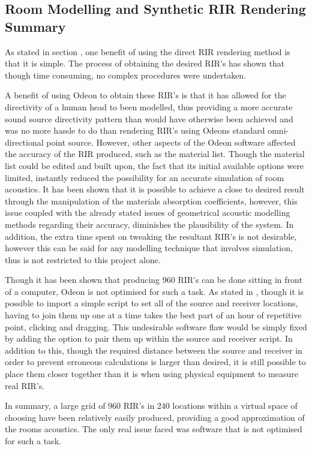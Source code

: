 \documentclass[../../main.tex]{subfiles}
\begin{document}
		\subsection{Room Modelling and Synthetic RIR Rendering Summary}

			As stated in section , one benefit of using the direct \ac{RIR} rendering method is that it is simple. The process of obtaining the desired \ac{RIR}'s has shown that though time consuming, no complex procedures were undertaken.

			A benefit of using Odeon to obtain these \ac{RIR}'s is that it has allowed for the directivity of a human head to been modelled, thus providing a more accurate sound source directivity pattern than would have otherwise been achieved and was no more hassle to do than rendering \ac{RIR}'s using Odeons standard omni-directional point source. However, other aspects of the Odeon software affected the accuracy of the \ac{RIR} produced, such as the material list. Though the material list could be edited and built upon, the fact that its initial available options were limited, instantly reduced the possibility for an accurate simulation of room acoustics. It has been shown that it is possible to achieve a close to desired result through the manipulation of the materials absorption coefficients, however, this issue coupled with the already stated issues of geometrical acoustic modelling methods regarding their accuracy, diminishes the plausibility of the system. In addition, the extra time spent on tweaking the resultant \ac{RIR}'s is not desirable, however this can be said for any modelling technique that involves simulation, thus is not restricted to this project alone.

			Though it has been shown that producing 960 \ac{RIR}'s can be done sitting in front of a computer, Odeon is not optimised for such a task. As stated in , though it is possible to import a simple script to set all of the source and receiver locations, having to join them up one at a time takes the best part of an hour of repetitive point, clicking and dragging. This undesirable software flaw would be simply fixed by adding the option to pair them up within the source and receiver script. In addition to this, though the required distance between the source and receiver in order to prevent erroneous calculations is larger than desired, it is still possible to place them closer together than it is when using physical equipment to measure real \ac{RIR}'s. 
			
			In summary, a large grid of 960 \ac{RIR}'s in 240 locations within a virtual space of choosing have been relatively easily produced, providing a good approximation of the rooms acoustics. The only real issue faced was software that is not optimised for such a task.


	
\end{document}
